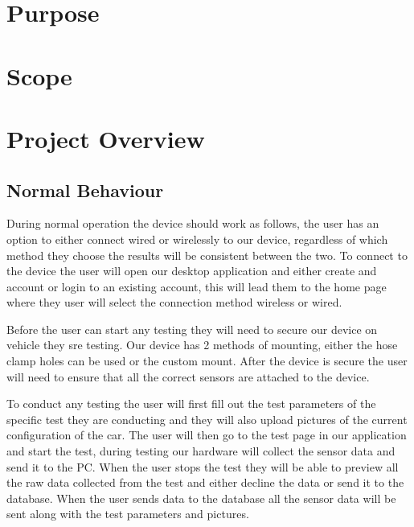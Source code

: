 \documentclass[12pt, titlepage]{article}
\begin{document}

\section{Purpose}



\section{Scope}


\section{Project Overview}

\subsection{Normal Behaviour}
During normal operation the device should work as follows, the user has an option to either connect wired or wirelessly to our device, regardless of which method they choose the results will be consistent between the two. To connect to the device the user will open our desktop application and either create and account or login to an existing account, this will lead them to the home page where they user will select the connection method wireless or wired.

Before the user can start any testing they will need to secure our device on vehicle they sre testing. Our device has 2 methods of mounting, either the hose clamp holes can be used or the custom mount. After the device is secure the user will need to ensure that all the correct sensors are attached to the device.

To conduct any testing the user will first fill out the test parameters of the specific test they are conducting and they will also upload pictures of the current configuration of the car. The user will then go to the test page in our application and start the test, during testing our hardware will collect the sensor data and send it to the PC. When the user stops the test they will be able to preview all the raw data collected from the test and either decline the data or send it to the database. When the user sends data to the database all the sensor data will be sent along with the test parameters and pictures.
\end{document}
